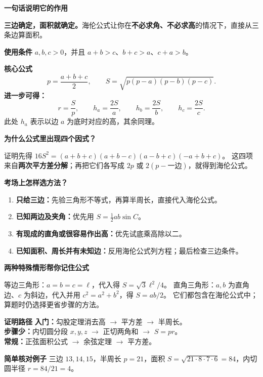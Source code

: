 \par\noindent\begin{minipage}{\linewidth}
\begin{summarybox}
  \textbf{\textcolor{CSummary}{一句话说明它的作用}}

  \textbf{三边确定，面积就确定。}海伦公式让你在\textbf{不必求角、不必求高}的情况下，直接从三条边算面积。

  \medskip
  \textbf{\textcolor{CSummary}{使用条件}}
  $a,b,c>0$，并且 $a+b>c$、$b+c>a$、$c+a>b$。

  \textbf{\textcolor{CSummary}{核心公式}}
  \[
   \boxed{p=\frac{a+b+c}{2},\qquad S=\sqrt{p(p-a)(p-b)(p-c)}}.
  \]
  \textbf{进一步可得：}
  \[
    r=\frac Sp,\qquad h_a=\frac{2S}{a},\qquad h_b=\frac{2S}{b},\qquad h_c=\frac{2S}{c}.
  \]
  此处 $h_a$ 表示以边 $a$ 为底时对应的高，其余同理。

  \textbf{\textcolor{CSummary}{为什么公式里出现四个因式？}}

  证明先得 $16S^2=(a+b+c)(a+b-c)(a-b+c)(-a+b+c)$。
  这四项来自\textbf{两次平方差分解}；再把它们各写成 $2p$ 或 $2(p-\text{一边})$，就得到海伦公式。

  \medskip
  \textbf{\textcolor{CSummary}{考场上怎样选方法？}}
  \begin{enumerate}[leftmargin=*,itemsep=0.3em]
   \item \textbf{只给三边：}先验三角形不等式，再算半周长，直接代入海伦公式。
   \item \textbf{已知两边及夹角：}优先用 $S=\tfrac12 ab\sin C$。
   \item \textbf{有现成的直角或很容易作出高：}优先试底乘高除以二。
   \item \textbf{已知面积、周长并有未知边：}反用海伦公式列方程；最后检查三边条件。
  \end{enumerate}

  \textbf{\textcolor{CSummary}{两种特殊情形帮你记住公式}}

  等边三角形：$a=b=c=\ell$，代入得 $S=\sqrt3\ell^2/4$。
  直角三角形：$a,b$ 为直角边、$c$ 为斜边，代入并用 $c^2=a^2+b^2$，得 $S=ab/2$。
  它们都包含在海伦公式中；算题时仍选择更省步骤的方法。

  \medskip
  \textbf{\textcolor{CSummary}{证明路径}}
  \textbf{入门：}勾股定理消去高 $\rightarrow$ 平方差 $\rightarrow$ 半周长。\\
  \textbf{步骤少：}内切圆分段 $x,y,z$ $\rightarrow$ 正切两角和 $\rightarrow$ $S=pr$。\\
  \textbf{常规：}正弦面积公式 $\rightarrow$ 余弦定理 $\rightarrow$ 平方差。

  \medskip
  \textbf{\textcolor{CSummary}{简单核对例子}}
  三边 $13,14,15$，半周长 $p=21$，面积
  $S=\sqrt{21\cdot8\cdot7\cdot6}=84$，内切圆半径 $r=84/21=4$。
\end{summarybox}
\end{minipage}\par
